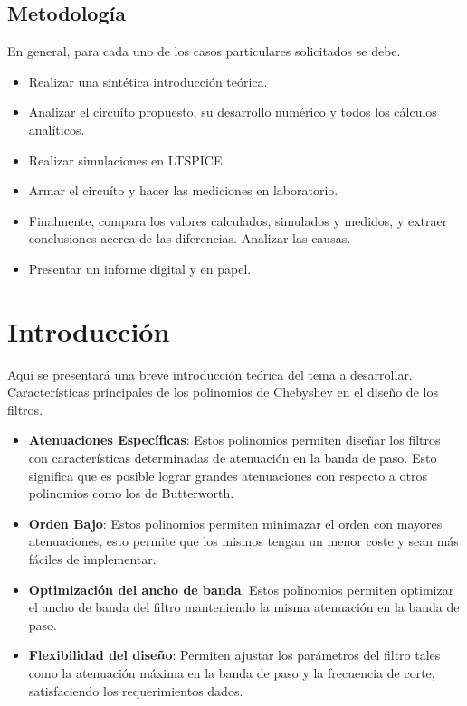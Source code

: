    \subsection{Metodología}
    En general, para cada uno de los casos particulares solicitados se debe.\\
    \begin{itemize}
        \item  Realizar una sintética introducción teórica.
        \item  Analizar el circuíto propuesto, su desarrollo numérico y todos los cálculos analíticos.
        \item Realizar simulaciones en LTSPICE.
        \item Armar el circuíto y hacer las mediciones en laboratorio.
        \item Finalmente, compara los valores calculados, simulados y medidos, y extraer conclusiones acerca de las diferencias. Analizar las causas.
        \item Presentar un informe digital y en papel.
    \end{itemize}
    \newpage

\section{Introducción}
    Aquí se presentará una breve introducción teórica del tema a desarrollar.\\
    Características principales de los polinomios de Chebyshev en el diseño de los filtros.\\

    \begin{itemize}
        \item \textbf{Atenuaciones Específicas}: Estos polinomios permiten diseñar los filtros con características determinadas de atenuación en la banda de paso. Esto significa que es posible lograr grandes atenuaciones con respecto a otros polinomios como los de Butterworth.
        \item \textbf{Orden Bajo}: Estos polinomios permiten minimazar el orden con mayores atenuaciones, esto permite que los mismos tengan un menor coste y sean más fáciles de implementar.
        \item \textbf{Optimización del ancho de banda}: Estos polinomios permiten optimizar el ancho de banda del filtro manteniendo la misma atenuación en la banda de paso.
        \item \textbf{Flexibilidad del diseño}: Permiten ajustar los parámetros del filtro tales como la atenuación máxima en la banda de paso y la frecuencia de corte, satisfaciendo los requerimientos dados.
    \end{itemize}

